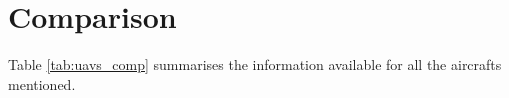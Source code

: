 \documentclass[english,fira]{ist-report}
\begin{document}
\section{Comparison}
Table \ref{tab:uavs_comp} summarises the information available for all the aircrafts mentioned. 

\end{document}
